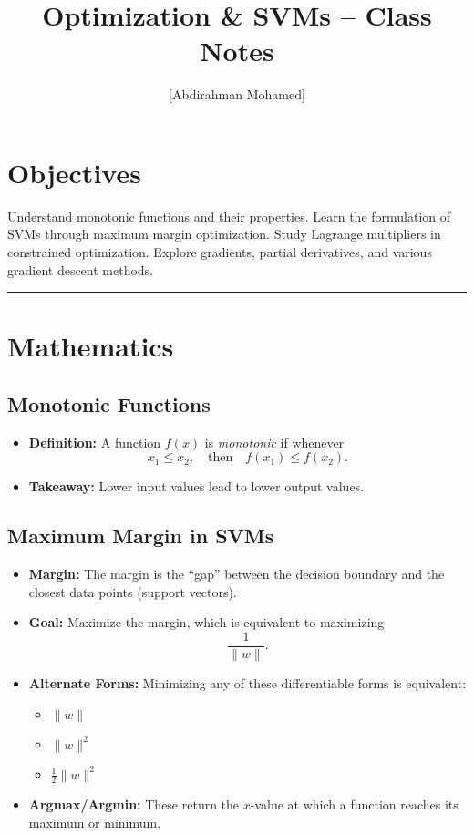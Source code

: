 \documentclass[11pt]{article}
\title{Optimization \& SVMs -- Class Notes}
\author{[Abdirahman Mohamed]}
\date{}
\begin{document}
\maketitle

\section*{Objectives}
\begin{outline}
    \1 Understand monotonic functions and their properties.
    \1 Learn the formulation of SVMs through maximum margin optimization.
    \1 Study Lagrange multipliers in constrained optimization.
    \1 Explore gradients, partial derivatives, and various gradient descent methods.
\end{outline}

\rule[0.0051in]{\textwidth}{0.00025in}

\section{Mathematics}

\subsection{Monotonic Functions}
\begin{itemize}
    \item \textbf{Definition:} A function $f(x)$ is \emph{monotonic} if whenever 
    \[
    x_1 \leq x_2, \quad \text{then} \quad f(x_1) \leq f(x_2).
    \]
    \item \textbf{Takeaway:} Lower input values lead to lower output values.
\end{itemize}

\subsection{Maximum Margin in SVMs}
\begin{itemize}
    \item \textbf{Margin:} The margin is the “gap” between the decision boundary and the closest data points (support vectors).
    \item \textbf{Goal:} Maximize the margin, which is equivalent to maximizing 
    \[
    \frac{1}{\|w\|}.
    \]
    \item \textbf{Alternate Forms:} Minimizing any of these differentiable forms is equivalent:
    \begin{itemize}
        \item $\|w\|$
        \item $\|w\|^2$
        \item $\frac{1}{2}\|w\|^2$
    \end{itemize}
    \item \textbf{Argmax/Argmin:} These return the $x$-value at which a function reaches its maximum or minimum.
\end{itemize}
\end{document}
